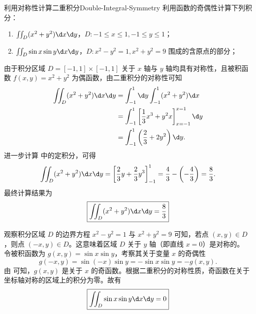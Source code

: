 \begin{problem}{利用对称性计算二重积分}{Double-Integral-Symmetry}
    利用函数的奇偶性计算下列积分：
    \begin{enumerate}
        \item $\iint_{D} (x^{2}+y^{2}) \d x \d y$，$D: -1 \leqslant x \leqslant 1, -1 \leqslant y \leqslant 1$；
        \item $\iint_{D} \sin x \sin y \d x \d y$，$D: x^{2}-y^{2}=1, x^{2}+y^{2}=9$ 围成的含原点的部分；
    \end{enumerate}
\end{problem}

\begin{solution}

    由于积分区域 $D = [-1, 1] \times [-1, 1]$ 关于 $x$ 轴与 $y$ 轴均具有对称性，且被积函数 $f(x, y) = x^2 + y^2$ 为偶函数，由二重积分的对称性可知
    \begin{equation}\label{eq:calc-1}
        \begin{aligned}
            \iint_{D} (x^2 + y^2) \d x \d y & = \int_{-1}^1 \d y \int_{-1}^1 (x^2 + y^2) \d x                       \\
                                            & = \int_{-1}^1 \left[ \frac{1}{3}x^3 + y^2 x \right]_{x=-1}^{x=1} \d y \\
                                            & = \int_{-1}^1 \left( \frac{2}{3} + 2y^2 \right) \d y.
        \end{aligned}
    \end{equation}
    进一步计算  中的定积分，可得
    \begin{equation}
        \iint_{D} (x^2 + y^2) \d x \d y = \left[ \frac{2}{3}y + \frac{2}{3}y^3 \right]_{-1}^1 = \frac{4}{3} - \left( -\frac{4}{3} \right) = \frac{8}{3}.
    \end{equation}
    最终计算结果为
    \begin{equation}
        \boxed{\iint_{D} (x^2 + y^2) \d x \d y = \frac{8}{3}}
    \end{equation}


    观察积分区域 $D$ 的边界方程 $x^2 - y^2 = 1$ 与 $x^2 + y^2 = 9$ 可知，若点 $(x, y) \in D$，则点 $(-x, y) \in D$。这意味着区域 $D$ 关于 $y$ 轴（即直线 $x=0$）是对称的。
    令被积函数为 $g(x, y) = \sin x \sin y$，考察其关于变量 $x$ 的奇偶性
    \begin{equation}\label{eq:parity-check}
        g(-x, y) = \sin(-x) \sin y = -\sin x \sin y = -g(x, y).
    \end{equation}
    由  可知，$g(x, y)$ 是关于 $x$ 的奇函数。根据二重积分的对称性质，奇函数在关于坐标轴对称的区域上的积分为零。故有
    \begin{equation}
        \boxed{\iint_{D} \sin x \sin y \d x \d y = 0}
    \end{equation}
\end{solution}


